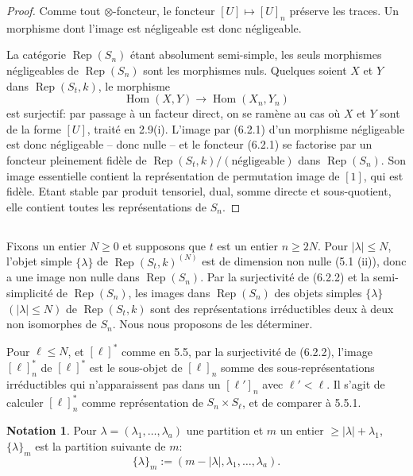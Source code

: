 \documentclass[11pt,a4paper]{article}
\theoremstyle{plain}
\theoremstyle{definition}
\newtheorem{notation}[theorem]{Notation}
\DeclareMathOperator{\Hom}{Hom}
\DeclareMathOperator{\Rep}{Rep}
\begin{document}
\begin{proof}
Comme tout $\otimes$-foncteur, le foncteur $[U] \mapsto [U]_n$ pr\'eserve les traces. Un morphisme dont l'image est n\'egligeable est donc n\'egligeable.

La cat\'egorie $\Rep(S_n)$ \'etant absolument semi-simple, les seuls morphismes n\'egligeables de $\Rep(S_n)$ sont les morphismes nuls. Quelques soient $X$ et $Y$ dans $\Rep(S_t, k)$, le morphisme
\begin{equation}
\Hom(X, Y) \to \Hom(X_n, Y_n) \tag{6.2.2}
\end{equation}
est surjectif: par passage \`a un facteur direct, on se ram\`ene au cas o\`u $X$ et $Y$ sont de la forme $[U]$, trait\'e en 2.9(i). L'image par (6.2.1) d'un morphisme n\'egligeable est donc n\'egligeable -- donc nulle -- et le foncteur (6.2.1) se factorise par un foncteur pleinement fid\`ele de $\Rep(S_t, k)/(\text{n\'egligeable})$ dans $\Rep(S_n)$. Son image essentielle contient la repr\'esentation de permutation image de $[1]$, qui est fid\`ele. Etant stable par produit tensoriel, dual, somme directe et sous-quotient, elle contient toutes les repr\'esentations de $S_n$.
\end{proof}

\subsection{}
Fixons un entier $N \geq 0$ et supposons que $t$ est un entier $n \geq 2N$. Pour $|\lambda| \leq N$, l'objet simple $\{\lambda\}$ de $\Rep(S_t, k)^{(N)}$ est de dimension non nulle (5.1 (ii)), donc a une image non nulle dans $\Rep(S_n)$. Par la surjectivit\'e de (6.2.2) et la semi-simplicit\'e de $\Rep(S_n)$, les images dans $\Rep(S_n)$ des objets simples $\{\lambda\}$ $(|\lambda| \leq N)$ de $\Rep(S_t, k)$ sont des repr\'esentations irr\'eductibles deux \`a deux non isomorphes de $S_n$. Nous nous proposons de les d\'eterminer.

Pour $\ell \leq N$, et $[\ell]^*$ comme en 5.5, par la surjectivit\'e de (6.2.2), l'image $[\ell]^*_n$ de $[\ell]^*$ est le sous-objet de $[\ell]_n$ somme des sous-repr\'esentations irr\'eductibles qui n'apparaissent pas dans un $[\ell']_n$ avec $\ell' < \ell$. Il s'agit de calculer $[\ell]^*_n$ comme repr\'esentation de $S_n \times S_\ell$, et de comparer \`a 5.5.1.

\begin{notation}
Pour $\lambda = (\lambda_1, \ldots, \lambda_a)$ une partition et $m$ un entier $\geq |\lambda| + \lambda_1$, $\{\lambda\}_m$ est la partition suivante de $m$:
\begin{equation}
\{\lambda\}_m := (m - |\lambda|, \lambda_1, \ldots, \lambda_a). \tag{6.3.1}
\end{equation}
\end{notation}
\end{document}
